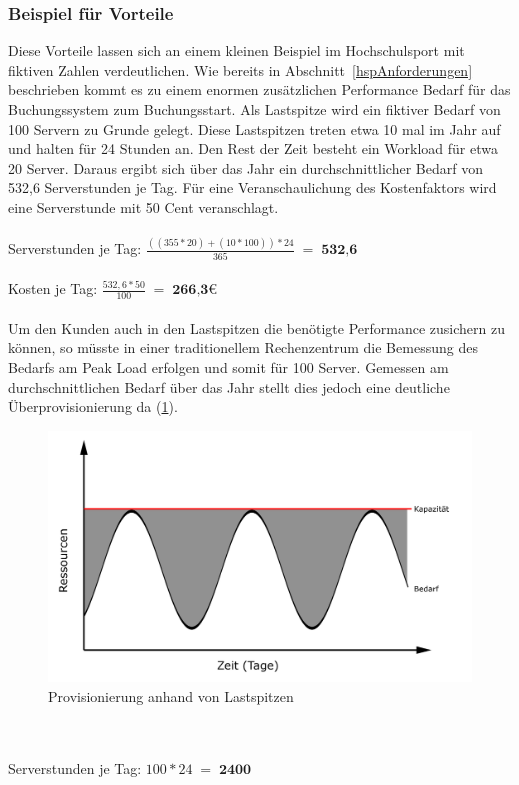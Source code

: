 \subsubsection{Beispiel für Vorteile}
Diese Vorteile lassen sich an einem kleinen Beispiel im Hochschulsport mit fiktiven Zahlen verdeutlichen. Wie bereits in Abschnitt~\ref{hspAnforderungen} beschrieben kommt es zu einem enormen zusätzlichen Performance Bedarf für das Buchungssystem zum Buchungsstart. Als Lastspitze wird ein fiktiver Bedarf von 100 Servern zu Grunde gelegt. Diese Lastspitzen treten etwa 10 mal im Jahr auf und halten für 24 Stunden an. Den Rest der Zeit besteht ein Workload für etwa 20 Server. Daraus ergibt sich über das Jahr ein durchschnittlicher Bedarf von 532,6 Serverstunden je Tag. Für eine Veranschaulichung des Kostenfaktors wird eine Serverstunde mit 50 Cent veranschlagt.
\\
\\
Serverstunden je Tag:    $\displaystyle \frac{((355 * 20) + (10 * 100)) * 24}{365}\; =\; \textbf{532,6}	 $\\
\\
Kosten je Tag:           $\displaystyle \frac{532,6 * 50}{100}\; =\; \textbf{266,3€} $\\
\\
Um den Kunden auch in den Lastspitzen die benötigte Performance zusichern zu können, so müsste in einer traditionellem Rechenzentrum die Bemessung des Bedarfs am Peak Load erfolgen und somit für 100 Server. Gemessen am durchschnittlichen Bedarf über das Jahr stellt dies jedoch eine deutliche Überprovisionierung da (\ref{fig:overprovisioning}).
	\begin{figure}[h]
		\centering
		\includegraphics[width=0.7\linewidth]{images/overprovisioning}
		\caption{Provisionierung anhand von Lastspitzen}
		\label{fig:overprovisioning}
	\end{figure}
\\ 
\\
Serverstunden je Tag:    $\displaystyle 100 * 24 \; =\; \textbf{2400} $\\
